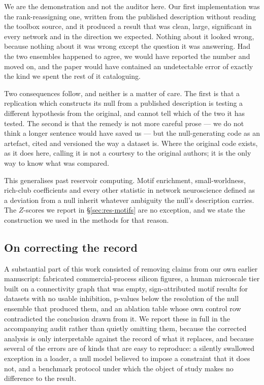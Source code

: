 We are the demonstration and not the auditor here. Our first implementation was the
rank-reassigning one, written from the published description without reading the toolbox
source, and it produced a result that was clean, large, significant in every network and
in the direction we expected. Nothing about it looked wrong, because nothing about it was
wrong except the question it was answering. Had the two ensembles happened to agree, we
would have reported the number and moved on, and the paper would have contained an
undetectable error of exactly the kind we spent the rest of it cataloguing.

Two consequences follow, and neither is a matter of care. The first is that a replication
which constructs its null from a published description is testing a different hypothesis
from the original, and cannot tell which of the two it has tested. The second is that the
remedy is not more careful prose --- we do not think a longer sentence would have saved
us --- but the null-generating code as an artefact, cited and versioned the way a dataset
is. Where the original code exists, as it does here, calling it is not a courtesy to the
original authors; it is the only way to know what was compared.

This generalises past reservoir computing. Motif enrichment, small-worldness, rich-club
coefficients and every other statistic in network neuroscience defined as a deviation from
a null inherit whatever ambiguity the null's description carries. The $Z$-scores we report
in \S\ref{sec:res-motifs} are no exception, and we state the construction we used in the
methods for that reason.

\subsection{On correcting the record}

A substantial part of this work consisted of removing claims from our own earlier
manuscript: fabricated commercial-process silicon figures, a human microscale tier built
on a connectivity graph that was empty, sign-attributed motif results for datasets with
no usable inhibition, p-values below the resolution of the null ensemble that produced
them, and an ablation table whose own control row contradicted the conclusion drawn from
it. We report these in full in the accompanying audit rather than quietly omitting them,
because the corrected analysis is only interpretable against the record of what it
replaces, and because several of the errors are of kinds that are easy to reproduce:
a silently swallowed exception in a loader, a null model believed to impose a constraint
that it does not, and a benchmark protocol under which the object of study makes no
difference to the result.

